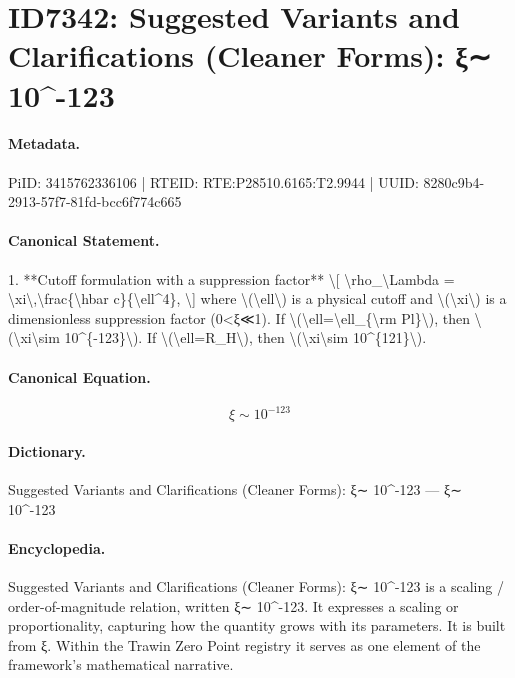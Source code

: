 \section*{ID7342: Suggested Variants and Clarifications (Cleaner Forms): ξ∼ 10\textasciicircum{}-123}
\paragraph{Metadata.}
PiID: 3415762336106 | RTEID: RTE:P28510.6165:T2.9944 | UUID: 8280c9b4-2913-57f7-81fd-bcc6f774c665

\paragraph{Canonical Statement.}
1. **Cutoff formulation with a suppression factor** \textbackslash{}[ \textbackslash{}rho\_\textbackslash{}Lambda = \textbackslash{}xi\textbackslash{},\textbackslash{}frac\{\textbackslash{}hbar c\}\{\textbackslash{}ell\textasciicircum{}4\}, \textbackslash{}] where \textbackslash{}(\textbackslash{}ell\textbackslash{}) is a physical cutoff and \textbackslash{}(\textbackslash{}xi\textbackslash{}) is a dimensionless suppression factor (0<ξ≪1). If \textbackslash{}(\textbackslash{}ell=\textbackslash{}ell\_\{\textbackslash{}rm Pl\}\textbackslash{}), then \textbackslash{}(\textbackslash{}xi\textbackslash{}sim 10\textasciicircum{}\{-123\}\textbackslash{}). If \textbackslash{}(\textbackslash{}ell=R\_H\textbackslash{}), then \textbackslash{}(\textbackslash{}xi\textbackslash{}sim 10\textasciicircum{}\{121\}\textbackslash{}).

\paragraph{Canonical Equation.}
\[
\xi\sim 10^{-123}
\]

\paragraph{Dictionary.}
Suggested Variants and Clarifications (Cleaner Forms): ξ∼ 10\textasciicircum{}-123 — ξ∼ 10\textasciicircum{}-123

\paragraph{Encyclopedia.}
Suggested Variants and Clarifications (Cleaner Forms): ξ∼ 10\textasciicircum{}-123 is a scaling / order-of-magnitude relation, written ξ∼ 10\textasciicircum{}-123. It expresses a scaling or proportionality, capturing how the quantity grows with its parameters. It is built from ξ. Within the Trawin Zero Point registry it serves as one element of the framework's mathematical narrative.
